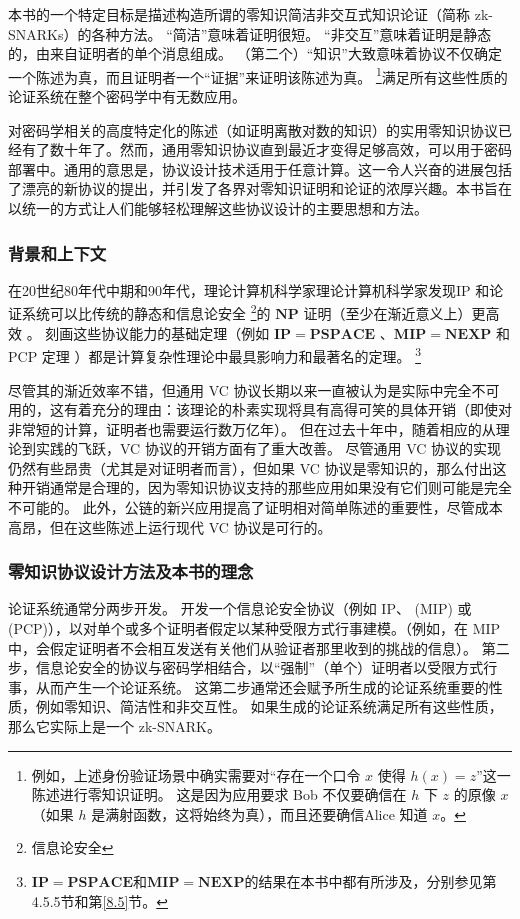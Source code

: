 本书的一个特定目标是描述构造所谓的零知识简洁非交互式知识论证（简称 zk-SNARKs）的各种方法。 “简洁”意味着证明很短。 “非交互”意味着证明是静态的，由来自证明者的单个消息组成。 （第二个）“知识”大致意味着协议不仅确定一个陈述为真，而且证明者一个“证据”来证明该陈述为真。 \footnote{例如，上述身份验证场景中确实需要对“存在一个口令 $x$ 使得 $h(x)=z$”这一陈述进行零知识证明。 这是因为应用要求 Bob 不仅要确信在 $h$ 下 $z$ 的原像 $x$（如果 $h$ 是满射函数，这将始终为真），而且还要确信Alice 知道 $x$。}满足所有这些性质的论证系统在整个密码学中有无数应用。

对密码学相关的高度特定化的陈述（如证明离散对数的知识\cite{Sch89}）的实用零知识协议已经有了数十年了。然而，通用零知识协议直到最近才变得足够高效，可以用于密码部署中。通用的意思是，协议设计技术适用于任意计算。这一令人兴奋的进展包括了漂亮的新协议的提出，并引发了各界对零知识证明和论证的浓厚兴趣。本书旨在以统一的方式让人们能够轻松理解这些协议设计的主要思想和方法。

\subsubsection{背景和上下文} 在20世纪80年代中期和90年代，理论计算机科学家理论计算机科学家发现IP 和论证系统可以比传统的静态和信息论安全 \footnote{信息论安全}的 $\mathbf{NP}$ 证明（至少在渐近意义上）更高效 。
刻画这些协议能力的基础定理（例如 $\mathbf{IP=PSPACE}$ \cite{LFKN92,Sha92}、$\mathbf{MIP=NEXP}$ \cite{BFL91} 和 PCP 定理 \cite{ALM+98,AS98}）都是计算复杂性理论中最具影响力和最著名的定理。 \footnote{$\mathbf{IP=PSPACE}$和$\mathbf{MIP=NEXP}$的结果在本书中都有所涉及，分别参见第4.5.5节和第\ref{8.5}节。}

尽管其的渐近效率不错，但通用 VC 协议长期以来一直被认为是实际中完全不可用的，这有着充分的理由：该理论的朴素实现将具有高得可笑的具体开销（即使对非常短的计算，证明者也需要运行数万亿年）。 但在过去十年中，随着相应的从理论到实践的飞跃，VC 协议的开销方面有了重大改善。 尽管通用 VC 协议的实现仍然有些昂贵（尤其是对证明者而言），但如果 VC 协议是零知识的，那么付出这种开销通常是合理的，因为零知识协议支持的那些应用如果没有它们则可能是完全不可能的。 此外，公链的新兴应用提高了证明相对简单陈述的重要性，尽管成本高昂，但在这些陈述上运行现代 VC 协议是可行的。

\subsubsection{零知识协议设计方法及本书的理念}  
论证系统通常分两步开发。 
开发一个信息论安全协议（例如 IP、 (MIP) 或 (PCP)），以对单个或多个证明者假定以某种受限方式行事建模。（例如，在 MIP 中，会假定证明者不会相互发送有关他们从验证者那里收到的挑战的信息）。 
第二步，信息论安全的协议与密码学相结合，以“强制”（单个）证明者以受限方式行事，从而产生一个论证系统。 这第二步通常还会赋予所生成的论证系统重要的性质，例如零知识、简洁性和非交互性。 如果生成的论证系统满足所有这些性质，那么它实际上是一个 zk-SNARK。

